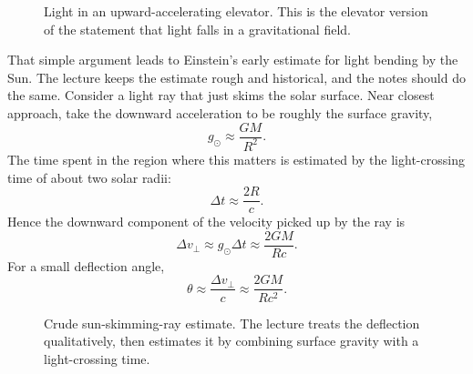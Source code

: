 \begin{figure}[ht]
\centering
{}
\caption{Light in an upward-accelerating elevator. This is the elevator version of the statement that light falls in a gravitational field.}
\end{figure}

That simple argument leads to Einstein's early estimate for light bending by the Sun. The lecture keeps the estimate rough and historical, and the notes should do the same. Consider a light ray that just skims the solar surface. Near closest approach, take the downward acceleration to be roughly the surface gravity,
\begin{equation}
g_\odot \approx \frac{GM}{R^2}.
\end{equation}
The time spent in the region where this matters is estimated by the light-crossing time of about two solar radii:
\begin{equation}
\Delta t \approx \frac{2R}{c}.
\end{equation}
Hence the downward component of the velocity picked up by the ray is
\begin{equation}
\Delta v_\perp \approx g_\odot \Delta t \approx \frac{2GM}{Rc}.
\end{equation}
For a small deflection angle,
\begin{equation}
\theta \approx \frac{\Delta v_\perp}{c}\approx \frac{2GM}{Rc^2}.
\end{equation}

\begin{figure}[ht]
\centering
{}%
\caption{Crude sun-skimming-ray estimate. The lecture treats the deflection qualitatively, then estimates it by combining surface gravity with a light-crossing time.}
\end{figure}

